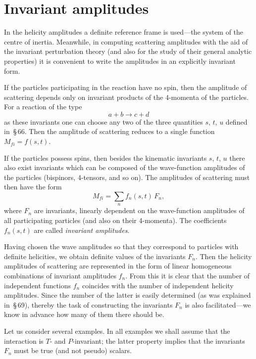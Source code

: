 \section{Invariant amplitudes}

In the helicity amplitudes a definite reference frame is used---the system of the centre of inertia. Meanwhile, in computing scattering amplitudes with the aid of the invariant perturbation theory (and also for the study of their general analytic properties) it is convenient to write the amplitudes in an explicitly invariant form.

If the particles participating in the reaction have no spin, then the amplitude of scattering depends only on invariant products of the 4-momenta of the particles. For a reaction of the type
\begin{equation}
a + b \to c + d
\tag{70.1}
\end{equation}
as these invariants one can choose any two of the three quantities $s$, $t$, $u$ defined in~\S\,66. Then the amplitude of scattering reduces to a single function $M_{fi} = f(s, t)$.

If the particles possess spins, then besides the kinematic invariants $s$, $t$, $u$ there also exist invariants which can be composed of the wave-function amplitudes of the particles (bispinors, 4-tensors, and so on). The amplitudes of scattering must then have the form
\begin{equation}
M_{fi} = \sum_n f_n(s, t)\,F_n,
\tag{70.2}
\end{equation}
where $F_n$ are invariants, linearly dependent on the wave-function amplitudes of all participating particles (and also on their 4-momenta). The coefficients $f_n(s, t)$ are called \textit{invariant amplitudes}.

Having chosen the wave amplitudes so that they correspond to particles with definite helicities, we obtain definite values of the invariants $F_n$. Then the helicity amplitudes of scattering are represented in the form of linear homogeneous combinations of invariant amplitudes $f_n$. From this it is clear that the number of independent functions $f_n$ coincides with the number of independent helicity amplitudes. Since the number of the latter is easily determined (as was explained in~\S\,69), thereby the task of constructing the invariants $F_n$ is also facilitated---we know in advance how many of them there should be.

Let us consider several examples. In all examples we shall assume that the interaction is $T$- and $P$-invariant; the latter property implies that the invariants $F_n$ must be true (and not pseudo) scalars.

